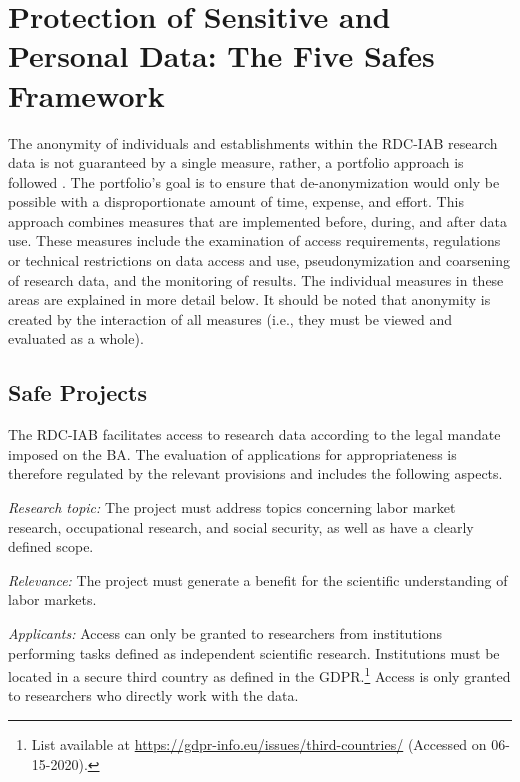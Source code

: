 \hypertarget{protection-of-sensitive-and-personal-data-the-five-safes-framework}{%
\section{Protection of Sensitive and Personal Data: The Five Safes Framework}\label{protection-of-sensitive-and-personal-data-the-five-safes-framework}}

The anonymity of individuals and establishments within the RDC-IAB research data is not guaranteed by a single measure, rather, a portfolio approach is followed \citep{hochfellner2014}. The portfolio's goal is to ensure that de-anonymization would only be possible with a disproportionate amount of time, expense, and effort. This approach combines measures that are implemented before, during, and after data use. These measures include the examination of access requirements, regulations or technical restrictions on data access and use, pseudonymization and coarsening of research data, and the monitoring of results. The individual measures in these areas are explained in more detail below. It should be noted that anonymity is created by the interaction of all measures (i.e., they must be viewed and evaluated as a whole).

\hypertarget{safe-projects}{%
\subsection{Safe Projects}\label{safe-projects}}

The RDC-IAB facilitates access to research data according to the legal mandate imposed on the BA. The evaluation of applications for appropriateness is therefore regulated by the relevant provisions and includes the following aspects.

\emph{Research topic:} The project must address topics concerning labor market research, occupational research, and social security, as well as have a clearly defined scope.

\emph{Relevance:} The project must generate a benefit for the scientific understanding of labor markets.

\emph{Applicants:} Access can only be granted to researchers from institutions performing tasks defined as independent scientific research. Institutions must be located in a secure third country as defined in the GDPR.\footnote{List available at \url{https://gdpr-info.eu/issues/third-countries/} (Accessed on 06-15-2020).} Access is only granted to researchers who directly work with the data.

